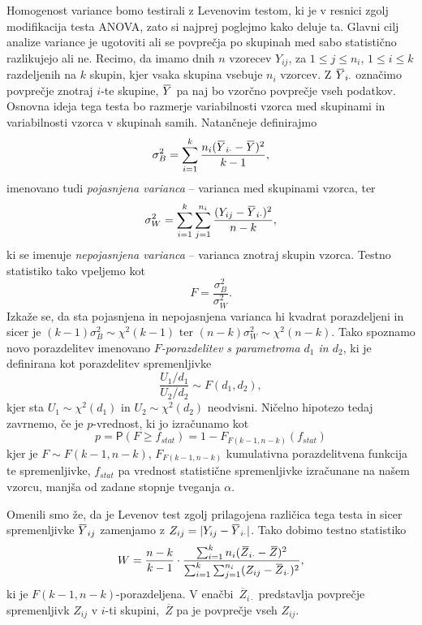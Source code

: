 \documentclass[a4paper,11pt]{article}
\newcommand{\ols}[1]{\mskip.5\thinmuskip\overline{\mskip-.5\thinmuskip {#1} \mskip-.5\thinmuskip}\mskip.5\thinmuskip} %
\newcommand{\olsi}[1]{\,\overline{\!{#1}}} %
\newcommand{\prob}{\mathsf{P}}
\begin{document}
Homogenost variance bomo testirali z Levenovim testom, ki je v resnici zgolj modifikacija testa ANOVA, zato si najprej poglejmo kako deluje ta. Glavni cilj analize variance je ugotoviti ali se povprečja po skupinah med sabo statistično razlikujejo ali ne. Recimo, da imamo dnih $n$ vzorecev $Y_{ij}$, za $1 \leq j \leq n_i$, $1 \leq i \leq k$ razdeljenih na $k$ skupin, kjer vsaka skupina vsebuje $n_i$ vzorcev. Z $\ols{Y}_{i\cdot}$ označimo povprečje znotraj $i$-te skupine, $\ols{Y}$ pa naj bo vzorčno povprečje vseh podatkov. Osnovna ideja tega testa bo razmerje variabilnosti vzorca med skupinami in variabilnosti vzorca v skupinah samih. Natančneje definirajmo 
\[
    \sigma^2_B = \sum_{i = 1}^k \frac{n_i (\ols{Y}_{i \cdot} - \ols{Y})^2}{k-1},
\]
imenovano tudi \emph{pojasnjena varianca} -- varianca med skupinami vzorca, ter
\[
    \sigma^2_W = \sum_{i = 1}^k \sum_{j = 1}^{n_i} \frac{(Y_{ij} - \ols{Y}_{i \cdot})^2}{n - k},
\] 
ki se imenuje \emph{nepojasnjena varianca} -- varianca znotraj skupin vzorca. Testno statistiko tako vpeljemo kot
\[
    F = \frac{\sigma^2_B}{\sigma^2_W}.
\]  
Izkaže se, da sta pojasnjena in nepojasnjena varianca hi kvadrat porazdeljeni in sicer je $(k-1)\sigma^2_B \sim \chi^2(k - 1)$ ter $(n-k)\sigma^2_W \sim \chi^2(n - k)$. Tako spoznamo novo porazdelitev imenovano \emph{$F$-porazdelitev s parametroma $d_1$ in $d_2$}, ki je definirana kot porazdelitev spremenljivke
\[
    \frac{U_1/d_1}{U_2/d_2} \sim F(d_1, d_2),
\] 
kjer sta $U_1 \sim \chi^2(d_1)$ in $U_2 \sim \chi^2(d_2)$ neodvisni. Ničelno hipotezo tedaj zavrnemo, če je $p$-vrednost, ki jo izračunamo kot
\[
    p = \prob(F \geq f_{stat}) = 1 - F_{F(k-1, n - k)}(f_{stat})
\]
kjer je $F \sim F(k - 1, n - k)$, $F_{F(k-1, n - k)}$ kumulativna porazdelitvena funkcija te spremenljivke, $f_{stat}$ pa vrednost statistične spremenljivke izračunane na našem vzorcu, manjša od zadane stopnje tveganja $\alpha$.



Omenili smo že, da je Levenov test zgolj prilagojena različica tega testa in sicer spremenljivke $\ols{Y}_{ij}$ zamenjamo z $Z_{ij} = \lvert Y_{ij} - \ols{Y}_{i \cdot}\rvert$. Tako dobimo testno statistiko 
\[
    W = \frac{n - k}{k - 1} \cdot \frac{\sum_{i = 1}^k n_i (\olsi{Z}_{i \cdot} - \olsi{Z})^2}{\sum_{i = 1}^k \sum_{j = 1}^{n_i} (Z_{ij} - \ols{Z}_{i \cdot})^2},
\] 
ki je $F(k - 1, n - k)$-porazdeljena. V enačbi $\olsi{Z}_{i \cdot}$ predstavlja povprečje spremenljivk $Z_{ij}$ v $i$-ti skupini, $\olsi{Z}$ pa je povprečje vseh $Z_{ij}$.
\newline
\end{document}
